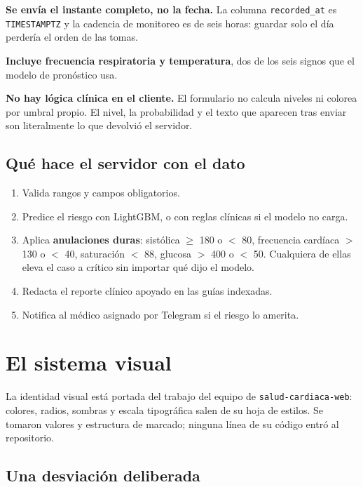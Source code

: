 \documentclass[11pt,a4paper]{article}
\begin{document}
\textbf{Se envía el instante completo, no la fecha.} La columna
\texttt{recorded\_at} es \texttt{TIMESTAMPTZ} y la cadencia de monitoreo es de
seis horas: guardar solo el día perdería el orden de las tomas.

\textbf{Incluye frecuencia respiratoria y temperatura}, dos de los seis
signos que el modelo de pronóstico usa.

\textbf{No hay lógica clínica en el cliente.} El formulario no calcula
niveles ni colorea por umbral propio. El nivel, la probabilidad y el texto que
aparecen tras enviar son literalmente lo que devolvió el servidor.

\subsection{Qué hace el servidor con el dato}

\begin{enumerate}
\item Valida rangos y campos obligatorios.
\item Predice el riesgo con LightGBM, o con reglas clínicas si el modelo no
  carga.
\item Aplica \textbf{anulaciones duras}: sistólica $\geq$ 180 o $<$ 80,
  frecuencia cardíaca $>$ 130 o $<$ 40, saturación $<$ 88, glucosa $>$ 400 o
  $<$ 50. Cualquiera de ellas eleva el caso a crítico sin importar qué dijo el
  modelo.
\item Redacta el reporte clínico apoyado en las guías indexadas.
\item Notifica al médico asignado por Telegram si el riesgo lo amerita.
\end{enumerate}

\newpage
\section{El sistema visual}

La identidad visual está portada del trabajo del equipo de
\texttt{salud-cardiaca-web}: colores, radios, sombras y escala tipográfica
salen de su hoja de estilos. Se tomaron valores y estructura de marcado;
ninguna línea de su código entró al repositorio.

\subsection{Una desviación deliberada}
\end{document}
